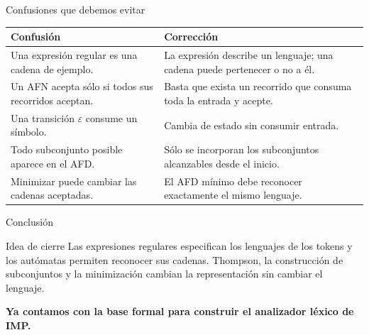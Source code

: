 \documentclass[11pt,spanish]{beamer}
\newcommand{\term}[1]{\textbf{\textcolor{indiagreen!80!black}{#1}}}
\begin{document}
\begin{frame}{Confusiones que debemos evitar}
\vfill

\begin{center}
\scriptsize
\renewcommand{\arraystretch}{1.23}
\begin{tabular}{|L{.39\textwidth}|L{.47\textwidth}|}
\hline
\textbf{Confusión} & \textbf{Corrección} \tabularnewline
\hline
Una expresión regular es una cadena de ejemplo. & La expresión describe un lenguaje; una cadena puede pertenecer o no a él. \tabularnewline
\hline
Un AFN acepta sólo si todos sus recorridos aceptan. & Basta que exista un recorrido que consuma toda la entrada y acepte. \tabularnewline
\hline
Una transición \(\varepsilon\) consume un símbolo. & Cambia de estado sin consumir entrada. \tabularnewline
\hline
Todo subconjunto posible aparece en el AFD. & Sólo se incorporan los subconjuntos alcanzables desde el inicio. \tabularnewline
\hline
Minimizar puede cambiar las cadenas aceptadas. & El AFD mínimo debe reconocer exactamente el mismo lenguaje. \tabularnewline
\hline
\end{tabular}
\end{center}

\vfill
\end{frame}

\begin{frame}{Conclusión}
\vfill

\begin{center}
\end{center}

\bigskip
\begin{block}{Idea de cierre}
Las expresiones regulares especifican los lenguajes de los tokens y los autómatas permiten reconocer sus cadenas. Thompson, la construcción de subconjuntos y la minimización cambian la representación sin cambiar el lenguaje.
\end{block}

\bigskip
\begin{center}
\term{Ya contamos con la base formal para construir el analizador léxico de IMP.}
\end{center}

\vfill
\end{frame}
\end{document}
